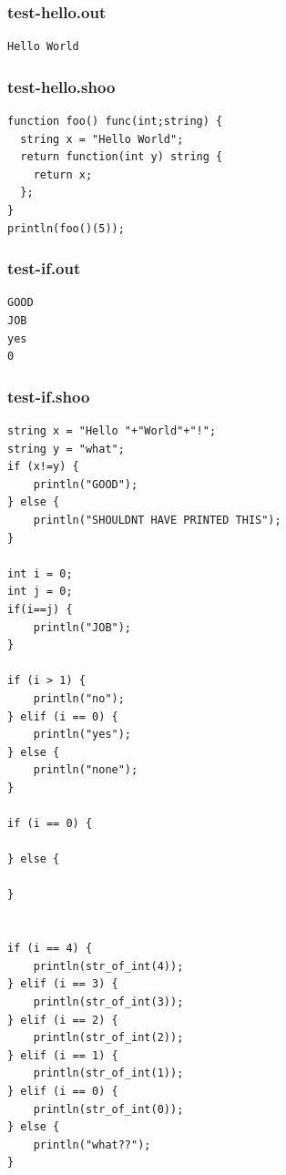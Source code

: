 \documentclass[12pt]{article}
\begin{document}
\subsubsection{test-hello.out}
\begin{mdframed}[hidealllines=true,backgroundcolor=green!10]
\begin{lstlisting}
Hello World
\end{lstlisting}
\end{mdframed}
\subsubsection{test-hello.shoo}
\begin{mdframed}[hidealllines=true,backgroundcolor=blue!10]
\begin{lstlisting}
function foo() func(int;string) {
  string x = "Hello World";
  return function(int y) string {
    return x;
  };
}
println(foo()(5));\end{lstlisting}
\end{mdframed}
\subsubsection{test-if.out}
\begin{mdframed}[hidealllines=true,backgroundcolor=green!10]
\begin{lstlisting}
GOOD
JOB
yes
0
\end{lstlisting}
\end{mdframed}
\subsubsection{test-if.shoo}
\begin{mdframed}[hidealllines=true,backgroundcolor=blue!10]
\begin{lstlisting}
string x = "Hello "+"World"+"!";
string y = "what";
if (x!=y) {
	println("GOOD");
} else {
	println("SHOULDNT HAVE PRINTED THIS");
}

int i = 0;
int j = 0;
if(i==j) {
	println("JOB");
}

if (i > 1) {
    println("no");
} elif (i == 0) {
    println("yes");
} else {
    println("none");
}

if (i == 0) {

} else {

}


if (i == 4) {
    println(str_of_int(4));
} elif (i == 3) {
    println(str_of_int(3));
} elif (i == 2) {
    println(str_of_int(2));
} elif (i == 1) {
    println(str_of_int(1));
} elif (i == 0) {
    println(str_of_int(0));
} else {
    println("what??");
}
\end{lstlisting}
\end{mdframed}
\end{document}
